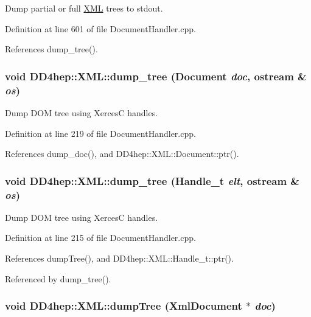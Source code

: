 Dump partial or full \hyperlink{namespace_d_d4hep_1_1_x_m_l}{XML} trees to stdout. 

Definition at line 601 of file DocumentHandler.cpp.

References dump\_\-tree().\hypertarget{namespace_d_d4hep_1_1_x_m_l_a890f94a51fe7c0a877ec482ec35caaf9}{
\subsubsection[{dump\_\-tree}]{\setlength{\rightskip}{0pt plus 5cm}void DD4hep::XML::dump\_\-tree ({\bf Document} {\em doc}, \/  ostream \& {\em os})}}
\label{namespace_d_d4hep_1_1_x_m_l_a890f94a51fe7c0a877ec482ec35caaf9}


Dump DOM tree using XercesC handles. 

Definition at line 219 of file DocumentHandler.cpp.

References dump\_\-doc(), and DD4hep::XML::Document::ptr().\hypertarget{namespace_d_d4hep_1_1_x_m_l_a1130069b87e258d98105350c812835dd}{
\subsubsection[{dump\_\-tree}]{\setlength{\rightskip}{0pt plus 5cm}void DD4hep::XML::dump\_\-tree ({\bf Handle\_\-t} {\em elt}, \/  ostream \& {\em os})}}
\label{namespace_d_d4hep_1_1_x_m_l_a1130069b87e258d98105350c812835dd}


Dump DOM tree using XercesC handles. 

Definition at line 215 of file DocumentHandler.cpp.

References dumpTree(), and DD4hep::XML::Handle\_\-t::ptr().

Referenced by dump\_\-tree().\hypertarget{namespace_d_d4hep_1_1_x_m_l_a7cf74afac9d5989eb5eb2862e9ae78b3}{
\subsubsection[{dumpTree}]{\setlength{\rightskip}{0pt plus 5cm}void DD4hep::XML::dumpTree (XmlDocument $\ast$ {\em doc})}}
\label{namespace_d_d4hep_1_1_x_m_l_a7cf74afac9d5989eb5eb2862e9ae78b3}


